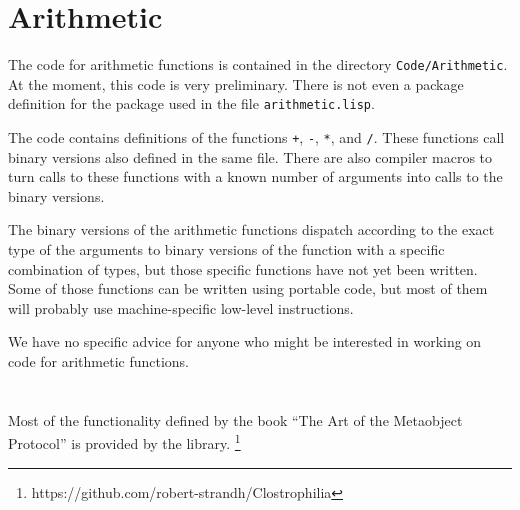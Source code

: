 \section{Arithmetic}

The code for arithmetic functions is contained in the directory
\texttt{Code/Arithmetic}.  At the moment, this code is very
preliminary.  There is not even a package definition for the package
used in the file \texttt{arithmetic.lisp}.

The code contains definitions of the functions \texttt{+}, \texttt{-},
\texttt{*}, and \texttt{/}.  These functions call binary versions also
defined in the same file.  There are also compiler macros to turn
calls to these functions with a known number of arguments into calls
to the binary versions.

The binary versions of the arithmetic functions dispatch according to
the exact type of the arguments to binary versions of the function
with a specific combination of types, but those specific functions
have not yet been written.  Some of those functions can be written
using portable code, but most of them will probably use
machine-specific low-level instructions. 

We have no specific advice for anyone who might be interested in
working on code for arithmetic functions.  

\section{\clos{}}
\label{sec-clos}

Most of the functionality defined by the book ``The Art of the
Metaobject Protocol'' is provided by the \clostrophilia{} library.%
\footnote{https://github.com/robert-strandh/Clostrophilia}



